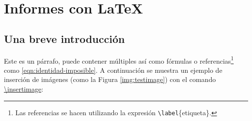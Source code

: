 %
%

\section{Informes con \LaTeX}

\subsection{Una breve introducción}
	
	Este es un párrafo, puede contener múltiples  así como fórmulas o referencias\footnote{Las referencias se hacen utilizando la expresión \texttt{\textbackslash label}\{etiqueta\}.} como \eqref{eqn:identidad-imposible}. A continuación se muestra un ejemplo de inserción de imágenes (como la Figura \ref{img:testimage}) con el comando \href{https://latex.ppizarror.com/informe.html#hlp-imagen}{\textbackslash insertimage}:


